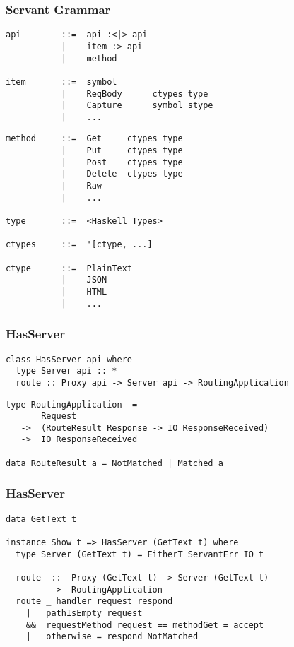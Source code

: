 \documentclass{beamer}
\begin{document}
\begin{frame}[fragile]
\frametitle{Servant Grammar}
\begin{verbatim}
api        ::=  api :<|> api
           |    item :> api
           |    method

item       ::=  symbol
           |    ReqBody      ctypes type
           |    Capture      symbol stype
           |    ...
\end{verbatim}
\end{frame}
\begin{frame}[fragile]
\begin{verbatim}
method     ::=  Get     ctypes type
           |    Put     ctypes type
           |    Post    ctypes type
           |    Delete  ctypes type
           |    Raw
           |    ...

type       ::=  <Haskell Types>

ctypes     ::=  '[ctype, ...]

ctype      ::=  PlainText
           |    JSON
           |    HTML
           |    ...
\end{verbatim}
\end{frame}

\begin{frame}[fragile]
\frametitle{HasServer}

\begin{verbatim}
class HasServer api where
  type Server api :: *
  route :: Proxy api -> Server api -> RoutingApplication
\end{verbatim}
\pause
\begin{verbatim}
type RoutingApplication  =
       Request
   ->  (RouteResult Response -> IO ResponseReceived)
   ->  IO ResponseReceived

data RouteResult a = NotMatched | Matched a
\end{verbatim}
\end{frame}

\begin{frame}[fragile]
\frametitle{HasServer}
\begin{verbatim}
data GetText t

instance Show t => HasServer (GetText t) where
  type Server (GetText t) = EitherT ServantErr IO t

  route  ::  Proxy (GetText t) -> Server (GetText t)
         ->  RoutingApplication
  route _ handler request respond
    |   pathIsEmpty request
    &&  requestMethod request == methodGet = accept
    |   otherwise = respond NotMatched
\end{verbatim}
\end{frame}
\end{document}
